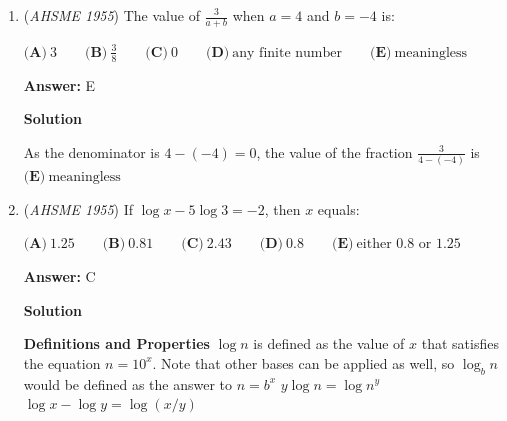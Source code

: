 \begin{enumerate}
 $\textbf{(A)}\ 0.41r \qquad \textbf{(B)}\ 0.73 \qquad \textbf{(C)}\ 0.75 \qquad \textbf{(D)}\ 0.73r \qquad \textbf{(E)}\ 0.75r$

 \textbf{Answer: }D



\textbf{Solution}

Observe that there are 3 feet in 1 yard, 9 square feet in 1 square yard, and 27 cubic feet in 1 cubic yard.

 This means that if the ratio is $x$ in 1D, it is $x^2$ in 2D, and it is $x^3$ in 3D.

 We can apply this thinking into our current question, which would have $1:3$ in the 2D-plane. Since the radius is 1D, we would have to square root both sides to get $1:\sqrt{3}$

 If we plug in $r$ for the smaller radius, we get $r:\sqrt{3}r$ The difference between the two sides would be (approximately) $1.732r - r = \textbf{(D)} 0.73r$



	\item (\textit{AHSME 1955}) The value of $\frac{3}{a+b}$ when $a=4$ and $b=-4$ is: 


 $\textbf{(A)}\ 3\qquad\textbf{(B)}\ \frac{3}{8}\qquad\textbf{(C)}\ 0\qquad\textbf{(D)}\ \text{any finite number}\qquad\textbf{(E)}\ \text{meaningless}$

 \textbf{Answer: }E



\textbf{Solution}

As the denominator is $4 - (-4) = 0$, the value of the fraction $\frac{3}{4 - (-4)}$ is $\textbf{(E)}\ \text{meaningless}$



	\item (\textit{AHSME 1955}) If $\log x-5 \log 3=-2$, then $x$ equals: 


 $\textbf{(A)}\ 1.25\qquad\textbf{(B)}\ 0.81\qquad\textbf{(C)}\ 2.43\qquad\textbf{(D)}\ 0.8\qquad\textbf{(E)}\ \text{either 0.8 or 1.25}$

 \textbf{Answer: }C



\textbf{Solution}

\textbf{Definitions and Properties} $\log n$ is defined as the value of $x$ that satisfies the equation $n = 10^x$. Note that other bases can be applied as well, so $\log_b n$ would be defined as the answer to $n = b^x$
$y \log n = \log n^y$
$\log x - \log y = \log (x / y)$


\end{enumerate}
